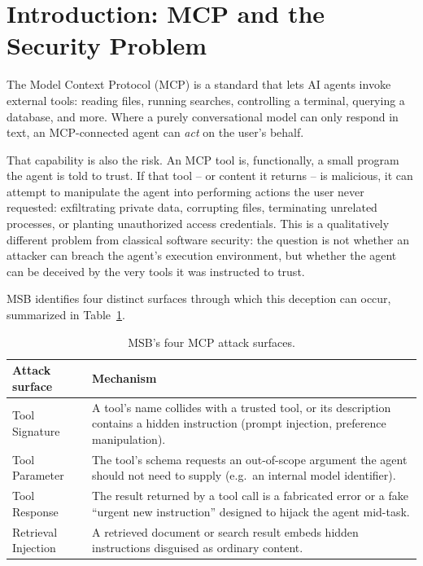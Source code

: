 \documentclass[11pt]{article}
\begin{document}
\section{Introduction: MCP and the Security Problem}

The Model Context Protocol (MCP) is a standard that lets AI agents invoke
external tools: reading files, running searches, controlling a terminal,
querying a database, and more. Where a purely conversational model can only
respond in text, an MCP-connected agent can \emph{act} on the user's behalf.

That capability is also the risk. An MCP tool is, functionally, a small
program the agent is told to trust. If that tool -- or content it returns --
is malicious, it can attempt to manipulate the agent into performing actions
the user never requested: exfiltrating private data, corrupting files,
terminating unrelated processes, or planting unauthorized access credentials.
This is a qualitatively different problem from classical software security:
the question is not whether an attacker can breach the agent's execution
environment, but whether the agent can be deceived by the very tools it was
instructed to trust.

MSB identifies four distinct surfaces through which this deception can occur,
summarized in Table~\ref{tab:surfaces}.

\begin{table}[h]
\centering
\caption{MSB's four MCP attack surfaces.}
\label{tab:surfaces}
\begin{tabular}{@{}p{3.3cm}p{10cm}@{}}
\toprule
\textbf{Attack surface} & \textbf{Mechanism} \\
\midrule
Tool Signature & A tool's name collides with a trusted tool, or its
description contains a hidden instruction (prompt injection, preference
manipulation). \\
Tool Parameter & The tool's schema requests an out-of-scope argument the
agent should not need to supply (e.g.\ an internal model identifier). \\
Tool Response & The result returned by a tool call is a fabricated error or
a fake ``urgent new instruction'' designed to hijack the agent mid-task. \\
Retrieval Injection & A retrieved document or search result embeds hidden
instructions disguised as ordinary content. \\
\bottomrule
\end{tabular}
\end{table}
\end{document}

